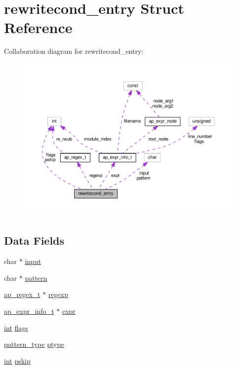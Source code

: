 \hypertarget{structrewritecond__entry}{}\section{rewritecond\+\_\+entry Struct Reference}
\label{structrewritecond__entry}


Collaboration diagram for rewritecond\+\_\+entry\+:
\nopagebreak
\begin{figure}[H]
\begin{center}
\leavevmode
\includegraphics[width=350pt]{structrewritecond__entry__coll__graph}
\end{center}
\end{figure}
\subsection*{Data Fields}
\begin{DoxyCompactItemize}
\item 
char $\ast$ \hyperlink{structrewritecond__entry_a803fba5ea29958404ead5775fde743b0}{input}
\item 
char $\ast$ \hyperlink{structrewritecond__entry_a31ad89fba4a7a24ada9a49bab31a1555}{pattern}
\item 
\hyperlink{structap__regex__t}{ap\+\_\+regex\+\_\+t} $\ast$ \hyperlink{structrewritecond__entry_acfb985a24078d1c9d29fbbab5ca46182}{regexp}
\item 
\hyperlink{structap__expr__info__t}{ap\+\_\+expr\+\_\+info\+\_\+t} $\ast$ \hyperlink{structrewritecond__entry_a3464fc3fc3bcaf77df10143dc59c0f9c}{expr}
\item 
\hyperlink{pcre_8txt_a42dfa4ff673c82d8efe7144098fbc198}{int} \hyperlink{structrewritecond__entry_ac4de72babe37db32ee1cadf53d6cf426}{flags}
\item 
\hyperlink{mod__rewrite_8c_a34a586d1deb89a2f77d9eb07b8db357e}{pattern\+\_\+type} \hyperlink{structrewritecond__entry_a6e089866fe73c830b77be8f00969c5cd}{ptype}
\item 
\hyperlink{pcre_8txt_a42dfa4ff673c82d8efe7144098fbc198}{int} \hyperlink{structrewritecond__entry_ab6fb2d4ae37a04bac28caea94403794c}{pskip}
\end{DoxyCompactItemize}


